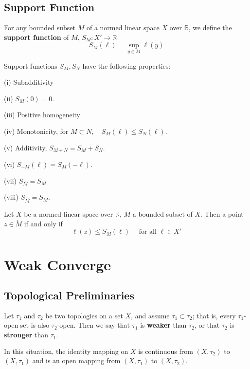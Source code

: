\documentclass[12pt, oneside]{book}
\begin{document}
\section{Support Function}

\begin{definition}
    For any bounded subset $M$ of a normed linear space $X$ over $\mathbb{R}$, we define the \textbf{support function} of $M$, $S_M : X'\rightarrow \mathbb{R}$
    \begin{equation*}
        S_M(\ell)
        =
        \sup _{y \in M} \ell(y)
    \end{equation*}
\end{definition}


\begin{theorem}
    Support functions $S_M, S_N$ have the following properties:

    (i) Subadditivity

    (ii) $S_M(0)=0$.

    (iii) Positive homogeneity

    (iv) Monotonicity, for $M \subset N, \quad S_M(\ell) \leq S_N(\ell)$.

    (v) Additivity, $S_{M+N}=S_M+S_N$.

    (vi) $S_{-M}(\ell)=S_M(-\ell)$.

    (vii) $S_{\overline{M}}=S_M$

    (viii) $S_{\overset{\frown}{M}}=S_M$.
\end{theorem}

\begin{theorem}
    Let $X$ be a normed linear space over $\mathbb{R}$, $M$ a bounded subset of $X$. Then a point $z \in \breve{M}$ if and only if
    \begin{equation*}
        \ell(z) \leq S_M(\ell) \quad \text{ for all } \ell \in X'
    \end{equation*}
\end{theorem}

\chapter{Weak Converge}

\section{Topological Preliminaries}


\begin{definition}
    Let $\tau_1$ and $\tau_2$ be two topologies on a set $X$, and assume $\tau_1 \subset \tau_2$; that is, every $\tau_1$-open set is also $\tau_2$-open. Then we say that $\tau_1$ is \textbf{weaker} than $\tau_2$, or that $\tau_2$ is \textbf{stronger} than $\tau_1$.

    In this situation, the identity mapping on $X$ is continuous from $\left(X, \tau_2\right)$ to $\left(X, \tau_1\right)$ and is an open mapping from $\left(X, \tau_1\right)$ to $\left(X, \tau_2\right)$.
\end{definition}
\end{document}
